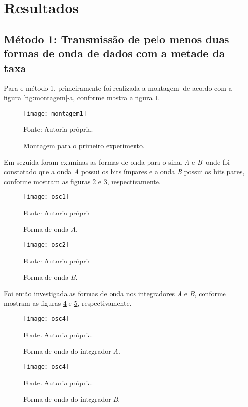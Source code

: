 \newpage
\section{Resultados}

\subsection{Método 1: Transmissão de pelo menos duas formas de onda de dados com a metade da taxa}

Para o método 1, primeiramente foi realizada a montagem, de acordo com a figura \ref{fig:montagem}-a, conforme mostra a figura \ref{fig:montagem1}.

\begin{figure}[H]
  \centering
  \caption{Montagem para o primeiro experimento.}
  \texttt{[image: montagem1]}
  
  \small Fonte: Autoria própria.
  \label{fig:montagem1}
\end{figure}

Em seguida foram examinas as formas de onda para o sinal \emph{A} e \emph{B}, onde foi constatado que a onda \emph{A} possui os bits ímpares e a onda \emph{B} possui os bits pares, conforme mostram as figuras \ref{fig:osc1} e \ref{fig:osc2}, respectivamente.

\begin{figure}[H]
  \centering
  \caption{Forma de onda \emph{A}.}
  \texttt{[image: osc1]}
  
  \small Fonte: Autoria própria.
  \label{fig:osc1}
\end{figure}

\begin{figure}[H]
  \centering
  \caption{Forma de onda \emph{B}.}
  \texttt{[image: osc2]}
  
  \small Fonte: Autoria própria.
  \label{fig:osc2}
\end{figure}

Foi então investigada as formas de onda nos integradores \emph{A} e \emph{B}, conforme mostram as figuras \ref{fig:osc3} e \ref{fig:osc4}, respectivamente.

\begin{figure}[H]
  \centering
  \caption{Forma de onda do integrador \emph{A}.}
  \texttt{[image: osc4]}
  
  \small Fonte: Autoria própria.
  \label{fig:osc3}
\end{figure}

\begin{figure}[H]
  \centering
  \caption{Forma de onda do integrador \emph{B}.}
  \texttt{[image: osc4]}
  
  \small Fonte: Autoria própria.
  \label{fig:osc4}
\end{figure}

